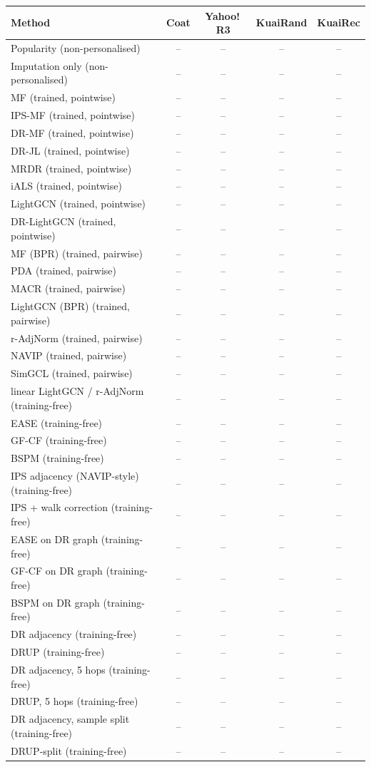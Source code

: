 \begin{tabular}{lcccc}
\toprule
Method & Coat & Yahoo!\,R3 & KuaiRand & KuaiRec\\
\midrule
Popularity (non-personalised) & -- & -- & -- & --\\
Imputation only (non-personalised) & -- & -- & -- & --\\
MF (trained, pointwise) & -- & -- & -- & --\\
IPS-MF (trained, pointwise) & -- & -- & -- & --\\
DR-MF (trained, pointwise) & -- & -- & -- & --\\
DR-JL (trained, pointwise) & -- & -- & -- & --\\
MRDR (trained, pointwise) & -- & -- & -- & --\\
iALS (trained, pointwise) & -- & -- & -- & --\\
LightGCN (trained, pointwise) & -- & -- & -- & --\\
DR-LightGCN (trained, pointwise) & -- & -- & -- & --\\
MF (BPR) (trained, pairwise) & -- & -- & -- & --\\
PDA (trained, pairwise) & -- & -- & -- & --\\
MACR (trained, pairwise) & -- & -- & -- & --\\
LightGCN (BPR) (trained, pairwise) & -- & -- & -- & --\\
r-AdjNorm (trained, pairwise) & -- & -- & -- & --\\
NAVIP (trained, pairwise) & -- & -- & -- & --\\
SimGCL (trained, pairwise) & -- & -- & -- & --\\
linear LightGCN / r-AdjNorm (training-free) & -- & -- & -- & --\\
EASE (training-free) & -- & -- & -- & --\\
GF-CF (training-free) & -- & -- & -- & --\\
BSPM (training-free) & -- & -- & -- & --\\
IPS adjacency (NAVIP-style) (training-free) & -- & -- & -- & --\\
IPS + walk correction (training-free) & -- & -- & -- & --\\
EASE on DR graph (training-free) & -- & -- & -- & --\\
GF-CF on DR graph (training-free) & -- & -- & -- & --\\
BSPM on DR graph (training-free) & -- & -- & -- & --\\
DR adjacency (training-free) & -- & -- & -- & --\\
DRUP (training-free) & -- & -- & -- & --\\
DR adjacency, 5 hops (training-free) & -- & -- & -- & --\\
DRUP, 5 hops (training-free) & -- & -- & -- & --\\
DR adjacency, sample split (training-free) & -- & -- & -- & --\\
DRUP-split (training-free) & -- & -- & -- & --\\
\bottomrule
\end{tabular}
